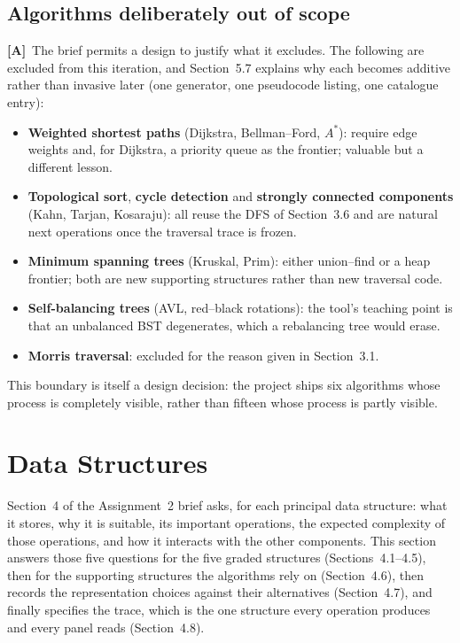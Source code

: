 \documentclass[11pt,a4paper]{article}
\newcommand{\A}{\textcolor{asmc}{\textbf{[A]}}}     %
\begin{document}
\subsection{Algorithms deliberately out of scope}

\A\ The brief permits a design to justify what it excludes. The following are excluded from this
iteration, and Section~5.7 explains why each becomes additive rather than invasive later
(one generator, one pseudocode listing, one catalogue entry):

\begin{itemize}[leftmargin=1.4em,topsep=2pt,itemsep=2pt]
  \item \textbf{Weighted shortest paths} (Dijkstra, Bellman--Ford, $A^{*}$): require edge weights
        and, for Dijkstra, a priority queue as the frontier; valuable but a different lesson.
  \item \textbf{Topological sort}, \textbf{cycle detection} and \textbf{strongly connected
        components} (Kahn, Tarjan, Kosaraju): all reuse the DFS of Section~3.6 and are natural
        next operations once the traversal trace is frozen.
  \item \textbf{Minimum spanning trees} (Kruskal, Prim): either union--find or a heap frontier;
        both are new supporting structures rather than new traversal code.
  \item \textbf{Self-balancing trees} (AVL, red--black rotations): the tool's teaching point is
        that an unbalanced BST degenerates, which a rebalancing tree would erase.
  \item \textbf{Morris traversal}: excluded for the reason given in Section~3.1.
\end{itemize}

\noindent This boundary is itself a design decision: the project ships six algorithms whose
process is completely visible, rather than fifteen whose process is partly visible.

\section{Data Structures}

Section~4 of the Assignment~2 brief asks, for each principal data structure: what it stores, why
it is suitable, its important operations, the expected complexity of those operations, and how it
interacts with the other components. This section answers those five questions for the five graded
structures (Sections~4.1--4.5), then for the supporting structures the algorithms rely on
(Section~4.6), then records the representation choices against their alternatives (Section~4.7),
and finally specifies the trace, which is the one structure every operation produces and every
panel reads (Section~4.8).
\end{document}
